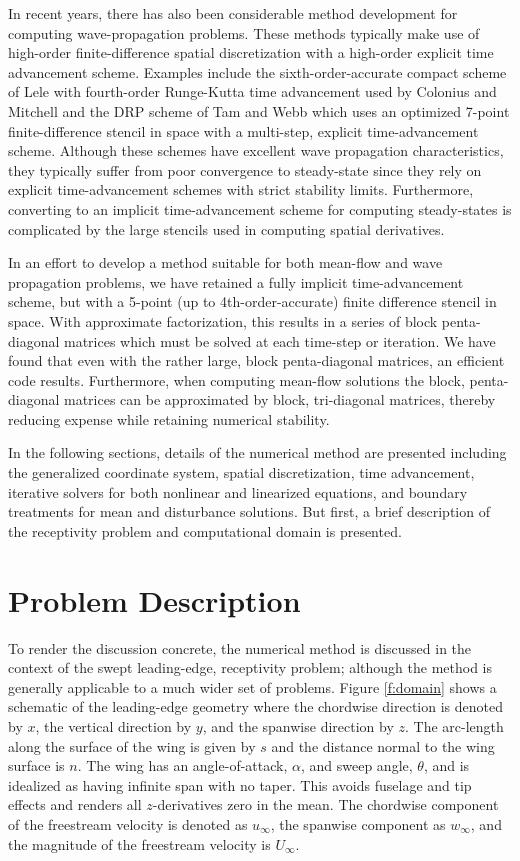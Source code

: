 In recent years, there has also been considerable method development for
computing wave-propagation problems.  These methods typically make use of
high-order finite-difference spatial discretization with a high-order explicit
time advancement scheme.  Examples include the sixth-order-accurate compact
scheme of Lele \cite{Lele:92} with fourth-order Runge-Kutta time advancement
used by Colonius \etal \cite{CoMoLe:95} and Mitchell \etal \cite{MiLeMo:96}
and the {\sf DRP} scheme of Tam and Webb \cite{TamWeb:93} which uses an
optimized 7-point finite-difference stencil in space with a multi-step,
explicit time-advancement scheme.  Although these schemes have excellent wave
propagation characteristics, they typically suffer from poor convergence to
steady-state since they rely on explicit time-advancement schemes with strict
stability limits.  Furthermore, converting to an implicit time-advancement
scheme for computing steady-states is complicated by the large stencils used
in computing spatial derivatives.

In an effort to develop a method suitable for both mean-flow and wave
propagation problems, we have retained a fully implicit time-advancement
scheme, but with a 5-point (up to 4th-order-accurate) finite difference
stencil in space.  With approximate factorization, this results in a series of
block penta-diagonal matrices which must be solved at each time-step or
iteration.  We have found that even with the rather large, block
penta-diagonal matrices, an efficient code results.  Furthermore, when
computing mean-flow solutions the block, penta-diagonal matrices can be
approximated by block, tri-diagonal matrices, thereby reducing expense while
retaining numerical stability.

In the following sections, details of the numerical method are presented
including the generalized coordinate system, spatial discretization, time
advancement, iterative solvers for both nonlinear and linearized equations,
and boundary treatments for mean and disturbance solutions.  But first, a
brief description of the receptivity problem and computational domain is
presented.

\section{Problem Description \label{s:problem} }

To render the discussion concrete, the numerical method is discussed in the
context of the swept leading-edge, receptivity problem; although the method is
generally applicable to a much wider set of problems.  Figure \ref{f:domain}
shows a schematic of the leading-edge geometry where the chordwise direction
is denoted by $x$, the vertical direction by $y$, and the spanwise direction
by $z$.  The arc-length along the surface of the wing is given by $s$ and
the distance normal to the wing surface is $n$.  The wing has an
angle-of-attack, $\alpha$, and sweep angle, $\theta$, and is idealized as
having infinite span with no taper.  This avoids fuselage and tip effects and
renders all $z$-derivatives zero in the mean.  The chordwise component of the
freestream velocity is denoted as $u_\infty$, the spanwise component as
$w_\infty$, and the magnitude of the freestream velocity is $U_\infty$.

